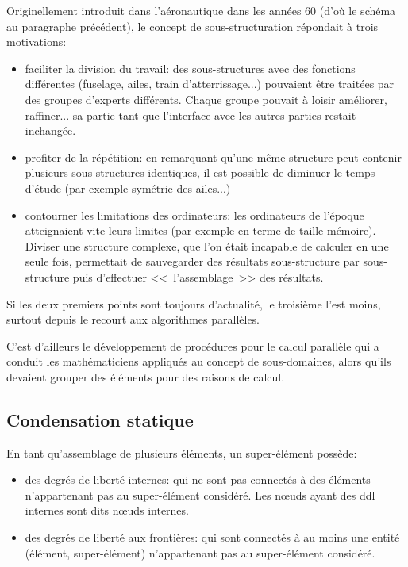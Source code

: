 \medskip
\begin{histoire}
Originellement introduit dans l'aéronautique dans les années 60 (d'où le schéma
au paragraphe précédent), le concept de sous-structuration
répondait à trois motivations:
\begin{itemize}
   \item faciliter la division du travail:
	des sous-structures avec des fonctions différentes (fuselage, ailes, train d'atterrissage...)
	pouvaient être traitées par des groupes d'experts différents. Chaque groupe pouvait
	à loisir améliorer, raffiner... sa partie tant que l'interface avec les autres parties
	restait inchangée.
   \item profiter de la répétition:
	en remarquant qu'une même structure peut contenir plusieurs sous-structures identiques,
	il est possible de diminuer le temps d'étude (par exemple symétrie des ailes...)
   \item contourner les limitations des ordinateurs:
	les ordinateurs de l'époque atteignaient vite leurs limites (par exemple en terme
	de taille mémoire). Diviser une structure complexe, que l'on était incapable de
	calculer en une seule fois, permettait de sauvegarder des résultats sous-structure
	par sous-structure puis d'effectuer <<~l'assemblage~>> des résultats.
\end{itemize}
Si les deux premiers points sont toujours d'actualité, le troisième l'est moins, surtout
depuis le recourt aux algorithmes parallèles.

C'est d'ailleurs le développement  de procédures pour le calcul parallèle qui a conduit
les mathématiciens appliqués au concept de sous-domaines, alors qu'ils devaient grouper
des éléments pour des raisons de calcul.
\end{histoire}

\medskip
\subsection{Condensation statique}\label{Sec-condens}

En tant qu'assemblage de plusieurs éléments, un super-élément possède:
\begin{itemize}
   \item des degrés de liberté internes:
	qui ne sont pas connectés à des éléments n'appartenant pas au super-élément considéré.
	Les nœuds ayant des ddl internes sont dits nœuds internes.
   \item des degrés de liberté aux frontières:
	qui sont connectés à au moins une entité (élément, super-élément)
	n'appartenant pas au super-élément considéré.
\end{itemize}

